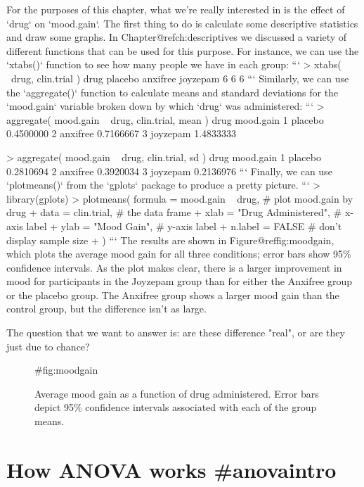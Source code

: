 For the purposes of this chapter, what we're really interested in is the effect of `drug` on `mood.gain`. The first thing to do is calculate some descriptive statistics and draw some graphs. In Chapter@refch:descriptives we discussed a variety of different functions that can be used for this purpose. For instance, we can use the `xtabs()` function to see how many people we have in each group:
```
> xtabs( ~drug, clin.trial )
drug
 placebo anxifree joyzepam 
       6        6        6 
```
Similarly, we can use the `aggregate()` function to calculate means and standard deviations for the `mood.gain` variable broken down by which `drug` was administered:
```
> aggregate( mood.gain ~ drug, clin.trial, mean )
      drug mood.gain
1  placebo 0.4500000
2 anxifree 0.7166667
3 joyzepam 1.4833333

> aggregate( mood.gain ~ drug, clin.trial, sd )
      drug mood.gain
1  placebo 0.2810694
2 anxifree 0.3920034
3 joyzepam 0.2136976
```
Finally, we can use `plotmeans()` from the `gplots` package to produce a pretty picture.
```
> library(gplots)
> plotmeans(  formula = mood.gain ~ drug,  # plot mood.gain by drug
+             data = clin.trial,           # the data frame
+             xlab = "Drug Administered",  # x-axis label
+             ylab = "Mood Gain",          # y-axis label
+             n.label = FALSE              # don't display sample size
+ )
```
The results are shown in Figure@reffig:moodgain, which plots the average mood gain for all three conditions; error bars show 95\% confidence intervals. As the plot makes clear, there is a larger improvement in mood for participants in the Joyzepam group than for either the Anxifree group or the placebo group. The Anxifree group shows a larger mood gain than the control group, but the difference isn't as large. 

The question that we want to answer is: are these difference "real", or are they just due to chance?


\begin{figure}
\begin{center}
\caption{Average mood gain as a function of drug administered. Error bars depict 95\% confidence intervals associated with each of the group means.}
\HR
{#fig:moodgain}
\end{center}
\end{figure}




\section{How ANOVA works {#anovaintro}}

